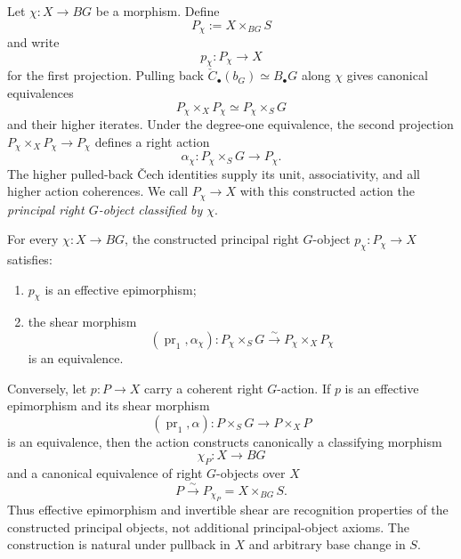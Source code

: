 \begin{definition}
\label{def:principal-group-object}
Let $\chi:X\to BG$ be a morphism.  Define
\[
    P_\chi
    :=
    X\times_{BG}S
\]
and write
\[
    p_\chi:P_\chi\longrightarrow X
\]
for the first projection.  Pulling back
$\check C_\bullet(b_G)\simeq B_\bullet G$ along $\chi$ gives canonical
equivalences
\[
    P_\chi\times_XP_\chi
    \simeq
    P_\chi\times_SG
\]
and their higher iterates.  Under the degree-one equivalence, the second
projection
$P_\chi\times_XP_\chi\to P_\chi$ defines a right action
\[
    \alpha_\chi:
    P_\chi\times_SG\longrightarrow P_\chi.
\]
The higher pulled-back \v{C}ech identities supply its unit, associativity, and
all higher action coherences.  We call
$P_\chi\to X$ with this constructed action the \emph{principal right
$G$-object classified by $\chi$}.
\end{definition}

\begin{theorem}
\label{prop:principal-classifying-map}
For every $\chi:X\to BG$, the constructed principal right $G$-object
$p_\chi:P_\chi\to X$ satisfies:
\begin{enumerate}
    \item $p_\chi$ is an effective epimorphism;
    \item the shear morphism
    \[
        (\operatorname{pr}_1,\alpha_\chi):
        P_\chi\times_SG
        \xrightarrow{\sim}
        P_\chi\times_XP_\chi
    \]
    is an equivalence.
\end{enumerate}

Conversely, let $p:P\to X$ carry a coherent right $G$-action.  If $p$ is an
effective epimorphism and its shear morphism
\[
    (\operatorname{pr}_1,\alpha):
    P\times_SG
    \longrightarrow
    P\times_XP
\]
is an equivalence, then the action constructs canonically a classifying
morphism
\[
    \chi_P:X\longrightarrow BG
\]
and a canonical equivalence of right $G$-objects over $X$
\[
    P\xrightarrow{\sim}P_{\chi_P}
    =
    X\times_{BG}S.
\]
Thus effective epimorphism and invertible shear are recognition properties of
the constructed principal objects, not additional principal-object axioms.
The construction is natural under pullback in $X$ and arbitrary base change
in $S$.
\end{theorem}

